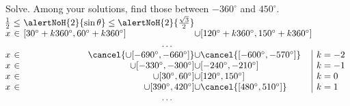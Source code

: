 \begin{frame}
\vskip -0.1cm
\begin{example}
Solve. Among your solutions, find those between $-360^\circ$ and $450^\circ$.
\hfil \hfil $\displaystyle 
\begin{array}{@{\!}r@{~}c@{~}l@{}c@{}l@{}l@{}|l}
\frac{1}{2}&\leq& \alertNoH{2}{\sin \theta} \leq \alertNoH{2}{\frac{\sqrt{3}}{2}}\\
x&\in&\left[30^{\circ}+k360^\circ, 60^\circ+k360^\circ\right]&\cup& \left[120^{\circ}+k360^\circ, 150^\circ+k360^\circ\right]\\
&&\multicolumn{3}{c}{\dots}\\
x&\in& 
\multicolumn{1}{r@{}}{\cancel{\cup[-690^\circ,  -660^\circ]}}&
\cup&
\cancel{[-600^\circ, -570^\circ]}&&k=-2\\
x&\in& 
\multicolumn{1}{r@{}}{\cup[-330^\circ,  -300^\circ]}&
\cup&
[-240^\circ, -210^\circ]&&k=-1\\
x&\in& 
\multicolumn{1}{r@{}}{\cup[30^\circ,  60^\circ]}&
\cup&
[120^\circ, 150^\circ]&&k=0\\
x&\in& 
\multicolumn{1}{r@{}}{\cup[390^\circ,  420^\circ]}&
\cup&
\cancel{[480^\circ, 510^\circ]} &&k=1\\
&&\multicolumn{3}{c}{\dots}\\
\end{array}
$


\end{example}
\end{frame}
